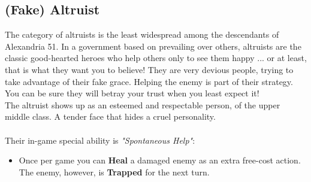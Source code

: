 \subsection{(Fake) Altruist}


The category of altruists is the least widespread among the descendants of Alexandria 51. In a government based on prevailing over others, altruists are the classic good-hearted heroes who help others only to see them happy ... or at least, that is what they want you to believe! They are very devious people,
trying to take advantage of their fake grace. Helping the enemy is part of their strategy. You can be sure they will betray your trust when you least expect it!\\
The altruist shows up as an esteemed and respectable person, of the upper middle class. A tender face that hides a cruel personality.\\\\
Their in-game special ability is  \textit{"Spontaneous Help"}:
\begin{itemize}
\item Once per game you can \textbf{Heal} a damaged enemy as an extra free-cost action. The enemy, however, is \textbf{Trapped} for the next turn.
\end{itemize}
